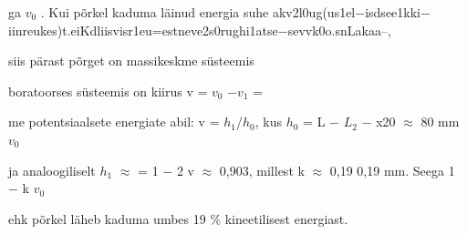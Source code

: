 ga $v_0$ . Kui põrkel kaduma läinud energia suhe akv2l0ug(us1el$-$isdsee1kki$-$iinreukes)t.eiKdliisvisr1eu=estneve2s0rughi1atse$-$sevvk0o.snLakaa--,

siis pärast põrget on massikeskme süsteemis

boratoorses süsteemis on kiirus v = $v_0$ $-$$v_1$ =

me potentsiaalsete energiate abil: v = $h_1$/$h_0$, kus $h_0$ = L $-$ $L_2$ $-$ x20 $\approx$ 80 mm $v_0$

ja analoogiliselt $h_1$ $\approx$ = 1 $-$ 2 v $\approx$ 0,903, millest k $\approx$ 0,19 0,19 mm. Seega 1 $-$ k $v_0$

ehk põrkel läheb kaduma umbes 19 \% kineetilisest energiast.
\probend
